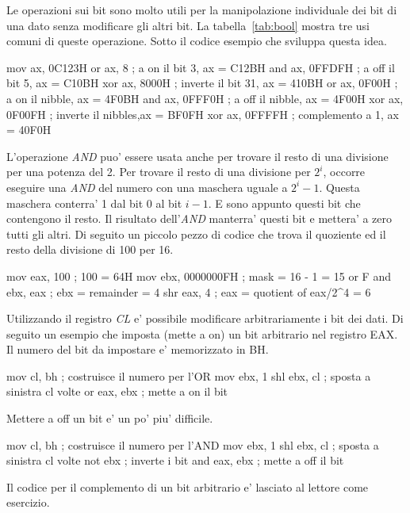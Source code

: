 Le operazioni sui bit sono molto utili per la manipolazione individuale
dei bit di una dato senza modificare gli altri bit. La tabella~\ref{tab:bool}
mostra tre usi comuni di queste operazione. Sotto il codice esempio che 
sviluppa questa idea.  
\begin{AsmCodeListing}[frame=none]
      mov    ax, 0C123H
      or     ax, 8          ; a on il bit 3,     ax = C12BH
      and    ax, 0FFDFH     ; a off il bit 5,    ax = C10BH
      xor    ax, 8000H      ; inverte il bit 31, ax = 410BH
      or     ax, 0F00H      ; a on il nibble,    ax = 4F0BH
      and    ax, 0FFF0H     ; a off il nibble,   ax = 4F00H
      xor    ax, 0F00FH     ; inverte il nibbles,ax = BF0FH
      xor    ax, 0FFFFH     ; complemento a 1,    ax = 40F0H
\end{AsmCodeListing}

L'operazione \emph{AND} puo' essere usata anche per trovare il resto di
una divisione per una potenza del 2. Per trovare il resto di una divisione
per $2^i$, occorre eseguire una \emph{AND} del numero con una maschera
uguale a $2^i - 1$. Questa maschera conterra' 1 dal bit 0 al bit $i-1$. E
sono appunto questi bit che contengono il resto. Il risultato dell'\emph{AND}
manterra' questi bit e mettera' a zero tutti gli altri. Di seguito un piccolo
pezzo di codice che trova il quoziente ed il resto della divisione di 100
per 16.
\begin{AsmCodeListing}[frame=none]
      mov    eax, 100        ; 100 = 64H
      mov    ebx, 0000000FH  ; mask = 16 - 1 = 15 or F
      and    ebx, eax        ; ebx = remainder = 4
      shr    eax, 4          ; eax = quotient of eax/2^4 = 6
\end{AsmCodeListing}
Utilizzando il registro \emph{CL} e' possibile modificare arbitrariamente i bit
dei dati. Di seguito un esempio che imposta (mette a on) un bit arbitrario nel
registro {\code EAX}. Il numero del bit da impostare e' memorizzato in {\code BH}.
\begin{AsmCodeListing}[frame=none]
      mov    cl, bh          ; costruisce il numero per l'OR
      mov    ebx, 1
      shl    ebx, cl         ; sposta a sinistra cl volte
      or     eax, ebx        ; mette a on il bit
\end{AsmCodeListing}
Mettere a off un bit e' un po' piu' difficile.
\begin{AsmCodeListing}[frame=none]
      mov    cl, bh          ; costruisce il numero per l'AND 
      mov    ebx, 1
      shl    ebx, cl         ; sposta a sinistra cl volte
      not    ebx             ; inverte i bit
      and    eax, ebx        ; mette a off il bit
\end{AsmCodeListing}
Il codice per il complemento di un bit arbitrario e' lasciato al lettore
come esercizio.


